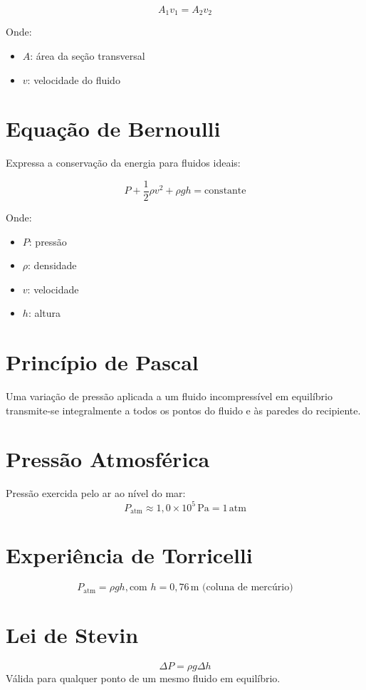 \documentclass[a4paper,12pt]{article}
\begin{document}
\begin{multicols}{2}
\[
A_1 v_1 = A_2 v_2
\]

Onde:
\begin{itemize}
  \item \( A \): área da seção transversal
  \item \( v \): velocidade do fluido
\end{itemize}

\section{Equação de Bernoulli}

Expressa a conservação da energia para fluidos ideais:

\[
P + \frac{1}{2} \rho v^2 + \rho g h = \text{constante}
\]

Onde:
\begin{itemize}
  \item \( P \): pressão
  \item \( \rho \): densidade
  \item \( v \): velocidade
  \item \( h \): altura
\end{itemize}

\section{Princípio de Pascal}
Uma variação de pressão aplicada a um fluido incompressível em equilíbrio transmite-se integralmente a todos os pontos do fluido e às paredes do recipiente.

\section{Pressão Atmosférica}
Pressão exercida pelo ar ao nível do mar:
\[
P_{\text{atm}} \approx 1{,}0 \times 10^5\, \text{Pa} = 1\, \text{atm}
\]

\section{Experiência de Torricelli}
\[
P_{\text{atm}} = \rho g h, \text{com } h = 0{,}76\, \text{m (coluna de mercúrio)}
\]

\section{Lei de Stevin}
\[
\Delta P = \rho g \Delta h
\]
Válida para qualquer ponto de um mesmo fluido em equilíbrio.


\end{multicols}
\end{document}
